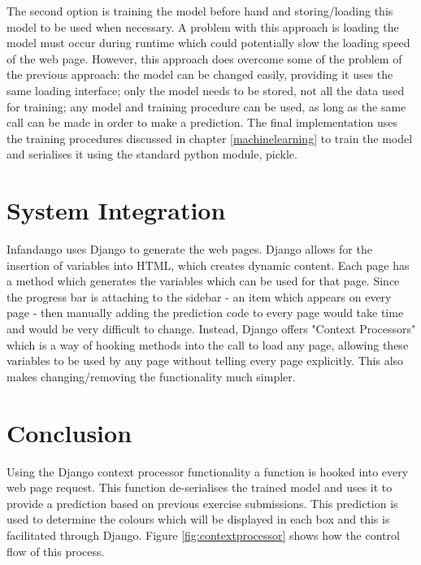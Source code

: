 The second option is training the model before hand and storing/loading this model to be used when necessary. A problem with this approach is loading the model must occur during runtime which could potentially slow the loading speed of the web page. However, this approach does overcome some of the problem of the previous approach: the model can be changed easily, providing it uses the same loading interface; only the model needs to be stored, not all the data used for training; any model and training procedure can be used, as long as the same call can be made in order to make a prediction. The final implementation uses the training procedures discussed in chapter \ref{machinelearning} to train the model and serialises it using the standard python module, pickle.

\section{System Integration}
Infandango uses Django to generate the web pages. Django allows for the insertion of variables into HTML, which creates dynamic content. Each page has a method which generates the variables which can be used for that page. Since the progress bar is attaching to the sidebar - an item which appears on every page - then manually adding the prediction code to every page would take time and would be very difficult to change. Instead, Django offers "Context Processors" which is a way of hooking methods into the call to load any page, allowing these variables to be used by any page without telling every page explicitly. This also makes changing/removing the functionality much simpler. 




\section{Conclusion}
Using the Django context processor functionality a function is hooked into every web page request. This function de-serialises the trained model and uses it to provide a prediction based on previous exercise submissions. This prediction is used to determine the colours which will be displayed in each box and this is facilitated through Django. Figure \ref{fig:contextprocessor} shows how the control flow of this process.

